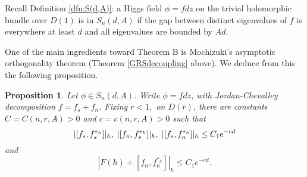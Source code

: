 \documentclass[10pt]{amsart}
\newtheorem{prop}[thm]{Proposition}
\theoremstyle{definition}
\begin{document}
Recall Definition \ref{dfn:S(d,A)}: a Higgs field $\phi = fdz$ on the trivial holomorphic bundle over $D(1)$ is in $S_n(d,A)$ if the gap between distinct eigenvalues of $f$ is everywhere at least $d$ and all eigenvalues are bounded by $Ad$. 

One of the main ingredients toward Theorem B is Mochizuki's asymptotic orthogonality theorem (Theorem \ref{GRSdecoupling} above).
We deduce from this the following proposition.
 \begin{prop}\label{asymdecoupling}
     Let $\phi \in S_n(d,A)$. Write $\phi = f dz$, with Jordan-Chevalley decomposition $f = f_s + f_n$. Fixing $r<1,$ on $D(r)$, there are constants $C=C(n,r,A)>0$ and $c=c(n,r,A)>0$ such that
     \begin{equation}\label{commutatorbounds}
         |[f_s,f_s^{*_h}]|_{h}, \hspace{1mm} |[f_{n},f_s^{*_h}]|_{h}, \hspace{1mm}|[f_s,f_n^{*_h}]|_{h} \leq C_1e^{-cd}
     \end{equation}
and 
\begin{equation} \label{commutatorbounds 2}
    |F(h)+[f_n,f_n^{*_h}]|_{h}\leq C_1e^{-cd}.
\end{equation}
 \end{prop}
\end{document}
